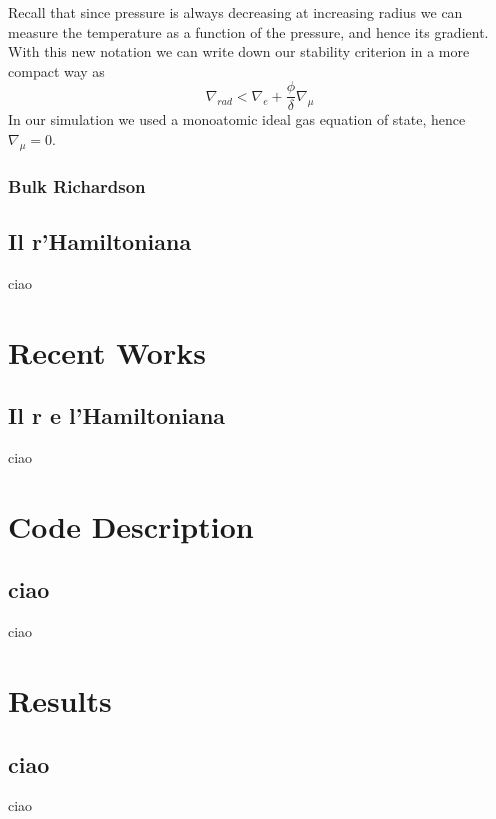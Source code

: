 \documentclass[11pt]{article}
\begin{document}
Recall that since pressure is always decreasing at increasing radius we can measure the temperature as a function of the pressure, and hence its gradient. \\
With this new notation we can write down our stability criterion in a more compact way as
\begin{equation}\label{stabcritcomp}
	\nabla_{rad} < \nabla_e + \frac{\phi}{\delta} \nabla_{\mu}
\end{equation}
In our simulation we used a monoatomic ideal gas equation of state, hence $\nabla_{\mu}=0$.

\subsubsection{Bulk Richardson}

\subsection{Il r'Hamiltoniana}
ciao


\section{Recent Works}
\subsection{Il r e l'Hamiltoniana}
ciao


\section{Code Description}
\subsection{ciao}
ciao


\section{Results}
\subsection{ciao}
ciao
\end{document}
